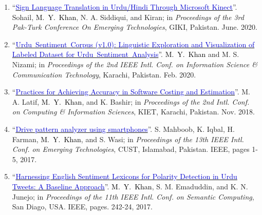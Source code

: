 \documentclass[a4paper, 10pt]{article}
\begin{document}
\begin{enumerate}[C\arabic*.]
\item ``\href{https://dpi.org/10.1088/1757-899x/899/1/012016}{\textcolor{MediumBlue}{Sign Language Translation in Urdu/Hindi Through Microsoft Kinect}}''. Sohail, \textcolor{Black}{M.~Y.~Khan}, N. A. Siddiqui, and Kiran; in \emph{Proceedings of the 3rd Pak-Turk Conference On Emerging Technologies}, GIKI, Pakistan. June. 2020.

\item ``\href{https://doi.org/10.1109/ICISCT49550.2020.9080043}{\textcolor{MediumBlue}{Urdu~Sentiment~Corpus (v1.0): Linguistic Exploration and Visualization of Labeled Dataset for Urdu~Sentiment~Analysis}}''. \textcolor{Black}{M.~Y.~Khan} and M. S. Nizami; in \emph{Proceedings of the 2nd IEEE Intl. Conf. on Information Science \& Communication Technology}, Karachi, Pakistan. Feb. 2020.

\item ``\href{http://kjcis.pafkiet.edu.pk/index.php/kjcis/article/view/13}{\textcolor{MediumBlue}{Practices for Achieving Accuracy in Software Costing and Estimation}}''. M. A. Latif, \textcolor{Black}{M.~Y.~Khan}, and K. Bashir; in \emph{Proceedings of the 2nd Intl. Conf. on Computing \& Information Sciences}, KIET, Karachi, Pakistan. Nov. 2018.

\item ``\href{https://doi.org/10.1109/ICET.2017.8281659}{\textcolor{MediumBlue}{Drive pattern analyzer using smartphones}}''. S. Mahboob, K. Iqbal, H. Farman, \textcolor{Black}{M.~Y.~Khan}, and S. Wasi; in \emph{ Proceedings of the 13th IEEE Intl. Conf. on Emerging Technologies}, CUST, Islamabad, Pakistan. IEEE, pages 1-5, 2017.

\item ``\href{https://doi.org/10.1109/ICSC.2017.68}{\textcolor{MediumBlue}{Harnessing English Sentiment Lexicons for Polarity Detection in Urdu Tweets: A Baseline Approach}}''. \textcolor{Black}{M.~Y.~Khan}, S. M. Emaduddin, and K. N. Junejo; in \emph{Proceedings of the 11th IEEE Intl. Conf. on Semantic Computing}, San Diago, USA. IEEE, pages. 242-24, 2017.
\end{enumerate}
\end{document}
